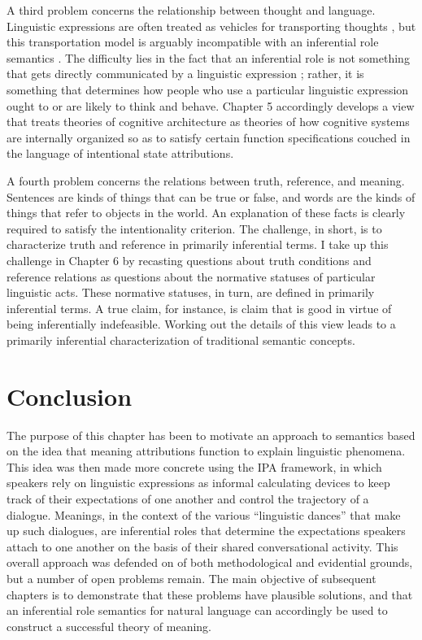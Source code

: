 A third problem concerns the relationship between thought and language. Linguistic expressions are often treated as vehicles for transporting thoughts \citep{Brandom:1994,KortaPerry:2015,Fodor:1998}, but this transportation model is arguably incompatible with an inferential role semantics \citep{Brandom:2010,Brandom:1994}. The difficulty lies in the fact that an inferential role is not something that gets directly communicated by a linguistic expression \citep{Brandom:2010,Brandom:1994}; rather, it is something that determines how people who use a particular linguistic expression ought to or are likely to think and behave. Chapter 5 accordingly develops a view that treats theories of cognitive architecture as theories of how cognitive systems are internally organized so as to satisfy certain function specifications couched in the language of intentional state attributions. 

A fourth problem concerns the relations between truth, reference, and meaning. Sentences are kinds of things that can be true or false, and words are the kinds of things that refer to objects in the world. An explanation of these facts is clearly required to satisfy the intentionality criterion. The challenge, in short, is to characterize truth and reference in primarily inferential terms. I take up this challenge in Chapter 6 by recasting questions about truth conditions and reference relations as questions about the normative statuses of particular linguistic acts. These normative statuses, in turn, are defined in primarily inferential terms. A true claim, for instance, is claim that is good in virtue of being inferentially indefeasible. Working out the details of this view leads to a primarily inferential characterization of traditional semantic concepts.

\section{Conclusion}

The purpose of this chapter has been to motivate an approach to semantics based on the idea that meaning attributions function to explain linguistic phenomena. This idea was then made more concrete using the IPA framework, in which speakers rely on linguistic expressions as informal calculating devices to keep track of their expectations of one another and control the trajectory of a dialogue. Meanings, in the context of the various ``linguistic dances'' that make up such dialogues, are inferential roles that determine the expectations speakers attach to one another on the basis of their shared conversational activity. This overall approach was defended on of both methodological and evidential grounds, but a number of open problems remain. The main objective of subsequent chapters is to demonstrate that these problems have plausible solutions, and that an inferential role semantics for natural language can accordingly be used to construct a successful theory of meaning.
